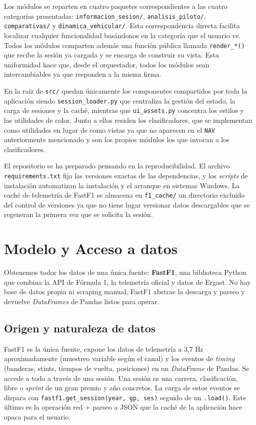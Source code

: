 \documentclass[12pt,a4paper,twoside,openright]{book}
\begin{document}
\noindent Los módulos se reparten en cuatro paquetes correspondientes a las cuatro categorías presentadas: \texttt{informacion\_sesion/}, \texttt{analisis\_piloto/}, \texttt{comparativas/} y \texttt{dinamica\_vehicular/}. Esta correspondencia directa facilita localizar cualquier funcionalidad basándonos en la categoría que el usuario ve. 
Todos los módulos comparten además una función pública llamada \texttt{render\_*()} que recibe la sesión ya cargada y se encarga de construir su vista. Esta uniformidad hace que, desde el orquestador, todos los módulos sean intercambiables ya que responden a la misma firma.

\noindent En la raíz de \texttt{src/} quedan únicamente los componentes compartidos por toda la aplicación siendo \texttt{session\_loader.py} que centraliza la gestión del estado, la carga de sesiones y la caché, mientras que \texttt{ui\_assets.py} concentra los estilos y las utilidades de color. Junto a ellos residen los clasificadores, que se implementan como utilidades en lugar de como vistas ya que no aparecen en el \texttt{NAV} anteriormente mencionado y son los propios módulos los que invocan a los clasificadores.

\noindent El repositorio se ha preparado pensando en la reproducibilidad. El archivo \texttt{requirements.txt} fija las versiones exactas de las dependencias, y los \textit{scripts} de instalación automatizan la instalación y el arranque en sistemas Windows. La caché de telemetría de FastF1 se almacena en \texttt{f1\_cache/} un directorio excluido del control de versiones ya que no tiene lugar versionar datos descargables que se regeneran la primera vez que se solicita la sesión.

\section{Modelo y Acceso a datos}\label{sec:datos}
Obtenemos todos los datos de una única fuente: \textbf{FastF1}, una biblioteca Python que combina la API de Fórmula 1, la telemetría oficial y datos de Ergast.
No hay base de datos propia ni scraping manual, FastF1 abstrae la descarga y parseo y devuelve \textit{DataFrames} de Pandas listos para operar.

\subsection{Origen y naturaleza de datos}
FastF1 es la única fuente, expone los datos de telemetría a 3,7 Hz aproximadamente (muestreo variable según el canal) y los eventos de \textit{timing} (banderas, stints, tiempos de vuelta, posiciones) en un \textit{DataFrame} de Pandas. Se accede a todo a través de una sesión.
Una sesión es una carrera, clasificación, libre o \textit{sprint} de un gran premio y año concretos. La carga de estos eventos se dispara con \texttt{fastf1.get\_session(year, gp, ses)} seguido de un \texttt{.load()}. Este último es la operación red + parseo a JSON que la caché de la aplicación hace opaca para el usuario.
\end{document}
